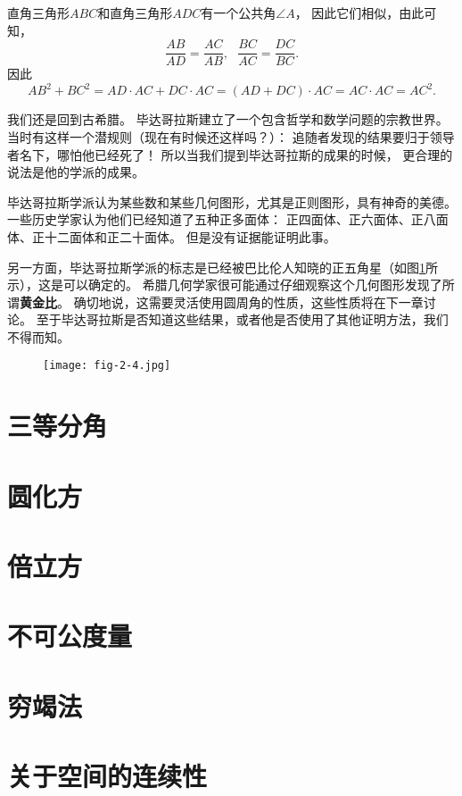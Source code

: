 \documentclass[cn,fancy,blue,11pt]{elegantbook}
\begin{document}
直角三角形$ABC$和直角三角形$ADC$有一个公共角$\angle A$，
因此它们相似，由此可知，
\[\frac{AB}{AD}=\frac{AC}{AB},~~~\frac{BC}{AC}=\frac{DC}{BC}.\]
因此\[AB^2+BC^2=AD\cdot AC+DC\cdot AC=(AD+DC)\cdot AC=AC\cdot AC=AC^2.\]

我们还是回到古希腊。
毕达哥拉斯建立了一个包含哲学和数学问题的宗教世界。
当时有这样一个潜规则（现在有时候还这样吗？）：
追随者发现的结果要归于领导者名下，哪怕他已经死了！
所以当我们提到毕达哥拉斯的成果的时候，
更合理的说法是他的学派的成果。

毕达哥拉斯学派认为某些数和某些几何图形，尤其是正则图形，具有神奇的美德。
一些历史学家认为他们已经知道了五种正多面体：
正四面体、正六面体、正八面体、正十二面体和正二十面体。
但是没有证据能证明此事。

另一方面，毕达哥拉斯学派的标志是已经被巴比伦人知晓的正五角星（如图\ref{fig:2-4}所示），这是可以确定的。
希腊几何学家很可能通过仔细观察这个几何图形发现了所谓\textbf{黄金比}。
确切地说，这需要灵活使用圆周角的性质，这些性质将在下一章讨论。
至于毕达哥拉斯是否知道这些结果，或者他是否使用了其他证明方法，我们不得而知。

\begin{figure}[htbp]
	\centering
	\texttt{[image: fig-2-4.jpg]}
	\caption{\label{fig:2-4}}
\end{figure}

\section{三等分角}

\section{圆化方}

\section{倍立方}

\section{不可公度量}

\section{穷竭法}

\section{关于空间的连续性}
\end{document}
